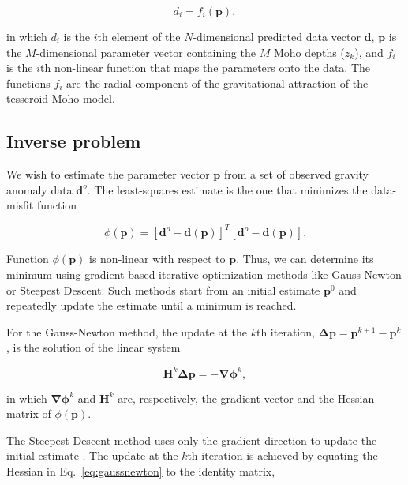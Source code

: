 \documentclass[extra,mreferee]{gji}
\begin{document}
\begin{equation}
    d_i = f_i(\mathbf{p}),
\end{equation}

\noindent in which $d_i$ is the $i$th element of the $N$-dimensional predicted
data vector $\mathbf{d}$, $\mathbf{p}$ is the $M$-dimensional parameter vector
containing the $M$ Moho depths ($z_k$),
and $f_i$ is the $i$th non-linear function that maps the parameters onto the
data.
The functions $f_i$ are the radial component of the gravitational attraction
of the tesseroid Moho model.



\subsection{Inverse problem}

We wish to estimate the parameter vector $\mathbf{p}$ from a set of observed
gravity anomaly data $\mathbf{d}^o$.
The least-squares estimate is the one that minimizes the data-misfit function

\begin{equation}
    \phi(\mathbf{p}) =
    [\mathbf{d}^o - \mathbf{d}(\mathbf{p})]^T[\mathbf{d}^o - \mathbf{d}(\mathbf{p})].
    \label{eq:data-misfit}
\end{equation}

Function $\phi(\mathbf{p})$ is non-linear with respect to $\mathbf{p}$.
Thus, we can determine its minimum using gradient-based
iterative optimization
methods like Gauss-Newton or Steepest Descent.
Such methods start from an initial estimate $\mathbf{p}^0$ and repeatedly
update the estimate until a minimum is reached.

For the Gauss-Newton method,
the update at the $k$th iteration,
$\mathbf{\Delta p} = \mathbf{p}^{k+1} - \mathbf{p}^k$,
is the solution of the linear system

\begin{equation}
    \mathbf{H}^k\mathbf{\Delta p} = -\mathbf{\nabla\phi}^k,
    \label{eq:gaussnewton}
\end{equation}

\noindent in which
$\mathbf{\nabla\phi}^k$ and $\mathbf{H}^k$ are, respectively,
the gradient vector and the Hessian matrix of $\phi(\mathbf{p})$.

The Steepest Descent method uses only the gradient direction
to update the initial estimate \citep{kelley1987}.
The update at the $k$th iteration is achieved by equating the Hessian
in Eq.~\ref{eq:gaussnewton} to the identity matrix,
\end{document}
